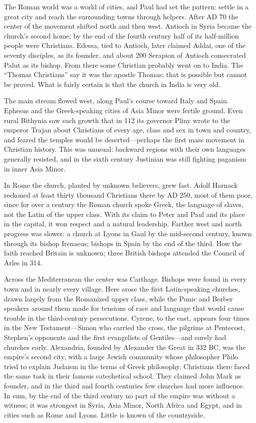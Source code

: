 The Roman world was a world of cities, and Paul had set the pattern: settle in a great city and reach
the surrounding towns through helpers. After AD 70 the center of the movement shifted north and then
west. Antioch in Syria became the church's second home; by the end of the fourth century half of its
half-million people were Christians. Edessa, tied to Antioch, later claimed Addai, one of the seventy
disciples, as its founder, and about 200 Serapion of Antioch consecrated Palut as its bishop. From
there some Christian probably went on to India. The ``Thomas Christians'' say it was the apostle
Thomas; that is possible but cannot be proved. What is fairly certain is that the church in India is
very old.

The main stream flowed west, along Paul's course toward Italy and Spain. Ephesus and the Greek-speaking
cities of Asia Minor were fertile ground. Even rural Bithynia saw such growth that in 112 its governor
Pliny wrote to the emperor Trajan about Christians of every age, class and sex in town and country, and
feared the temples would be deserted---perhaps the first mass movement in Christian history. This was
unusual: backward regions with their own languages generally resisted, and in the sixth century
Justinian was still fighting paganism in inner Asia Minor.

In Rome the church, planted by unknown believers, grew fast. Adolf Harnack reckoned at least thirty
thousand Christians there by AD 250, most of them poor, since for over a century the Roman church spoke
Greek, the language of slaves, not the Latin of the upper class. With its claim to Peter and Paul and
its place in the capital, it won respect and a natural leadership. Farther west and north progress was
slower: a church at Lyons in Gaul by the mid-second century, known through its bishop Irenaeus;
bishops in Spain by the end of the third. How the faith reached Britain is unknown; three British
bishops attended the Council of Arles in 314.

Across the Mediterranean the center was Carthage. Bishops were found in every town and in nearly every village.
Here arose the first Latin-speaking churches, drawn largely from the Romanized upper class, while the
Punic and Berber speakers around them made for tensions of race and language that would cause trouble
in the third-century persecutions. Cyrene, to the east, appears four times in the New Testament---Simon
who carried the cross, the pilgrims at Pentecost, Stephen's opponents and the first evangelists
of Gentiles---and surely had churches early. Alexandria, founded by Alexander the Great in 332 BC,
was the empire's second city, with a large Jewish community whose philosopher Philo tried to explain
Judaism in the terms of Greek philosophy. Christians there faced the same task in their famous
catechetical school. They claimed John Mark as founder, and in the third and fourth centuries few
churches had more influence. In sum, by the end of the third century no part of the empire was without
a witness; it was strongest in Syria, Asia Minor, North Africa and Egypt, and in cities such as Rome
and Lyons. Little is known of the countryside.


